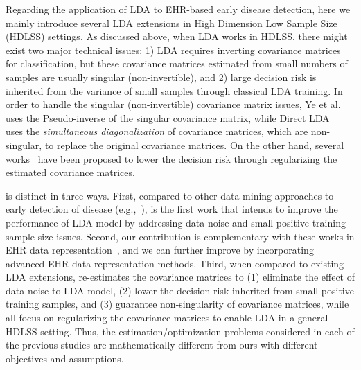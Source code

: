 Regarding the application of LDA to EHR-based early disease detection, here we mainly introduce several LDA extensions in High Dimension Low Sample Size (HDLSS) settings.
As discussed above, when LDA works in HDLSS, there might exist two major technical issues: 1) LDA requires inverting covariance matrices for classification, but these covariance matrices estimated from small numbers of samples are usually singular (non-invertible), and 2) large decision risk is inherited from the variance of small samples through classical LDA training.
In order to handle the singular (non-invertible) covariance matrix issues, Ye et al.~\cite{ye2004optimization} uses the Pseudo-inverse of the singular covariance matrix, while Direct LDA~\cite{lu2003face,gao2006direct} uses the \emph{simultaneous diagonalization} of covariance matrices, which are non-singular, to replace the original covariance matrices.
On the other hand, several works~\cite{clemmensen2011sparse,qiao2008effective,shao2011sparse} have been proposed to lower the decision risk through regularizing the estimated covariance matrices.



\TheName{} is distinct in three ways.
First, compared to other data mining approaches to early detection of disease (e.g.,~\cite{Lindstrom01032003, riskprediction, zheng_predictive_2015, yoo_data_2011}), \TheName{} is the first work that intends to improve the performance of LDA model by addressing data noise and small positive training sample size issues.
Second, our contribution is complementary with these works in EHR data representation~\cite{wang_towards_2012, wang_framework_2012, liu_temporal_2015}, and we can further improve \TheName{} by incorporating advanced EHR data representation methods.
Third, when compared to existing LDA extensions, \TheName{} re-estimates the covariance matrices to (1) eliminate the effect of data noise to LDA model, (2) lower the decision risk inherited from small positive training samples, and (3) guarantee non-singularity of covariance matrices, while~\cite{ye2004optimization,lu2003face,gao2006direct,clemmensen2011sparse,qiao2008effective,shao2011sparse} all focus on regularizing the covariance matrices to enable LDA in a general HDLSS setting.
Thus, the estimation/optimization problems considered in each of the previous studies are mathematically different from ours with different objectives and assumptions.


